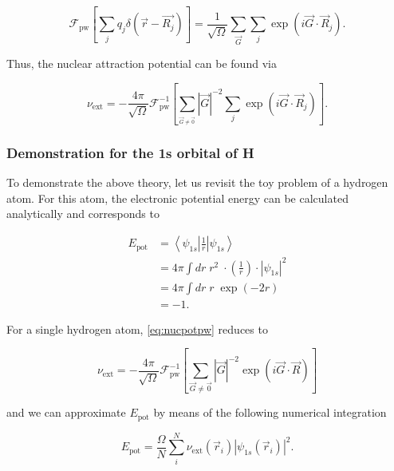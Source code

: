 \begin{equation}
    \mathcal{F}_{\text{pw}} \left[\sum_{j} q_{j} \delta(\vec{r} - \vec{R_{j}})\right] = \frac{1}{\sqrt{\Omega}} \sum_{\vec{G}} \sum_{j} \exp \left(i \vec{G} \cdot \vec{R}_{j} \right).
\end{equation}

Thus, the nuclear attraction potential can be found via

\begin{equation}
    \nu_{\text{ext}} = -\frac{4 \pi}{\sqrt{\Omega}} \mathcal{F}_{\text{pw}}^{-1} \left[\sum_{_{\vec{G} \neq \vec{0}}} |\vec{G}|^{-2} \sum_{j} \exp \left(i \vec{G} \cdot \vec{R}_{j} \right) \right].
    \label{eq:nucpotpw}
\end{equation}

%
%
%
\subsubsection{Demonstration for the 1s orbital of H}

To demonstrate the above theory, let us revisit the toy problem of a hydrogen atom. For this atom, the electronic potential energy can be calculated analytically and corresponds to

\begin{align}
    E_{\text{pot}} &= \left<\psi_{1s} \left| \frac{1}{r} \right| \psi_{1s}\right> \\
    &= 4 \pi \int dr \; r^{2} \; \cdot \left(\frac{1}{r}\right) \cdot |\psi_{1s}|^{2} \\
    &= 4 \pi \int dr \; r \; \exp \left(-2r \right) \\
    &= -1.
\end{align}

For a single hydrogen atom, \cref{eq:nucpotpw} reduces to

\begin{equation}
    \nu_{\text{ext}} = -\frac{4 \pi}{\sqrt{\Omega}} \mathcal{F}_{\text{pw}}^{-1} \left[ \sum_{\vec{G} \neq \vec{0}} |\vec{G}|^{-2} \exp \left(i \vec{G} \cdot \vec{R} \right) \right]
\end{equation}

and we can approximate $E_{\text{pot}}$ by means of the following numerical integration

\begin{equation}
    E_{\text{pot}} = \frac{\Omega}{N} \sum_{i}^{N} \nu_{\text{ext}}(\vec{r}_{i}) |\psi_{1s}(\vec{r}_{i})|^{2}.
\end{equation}

